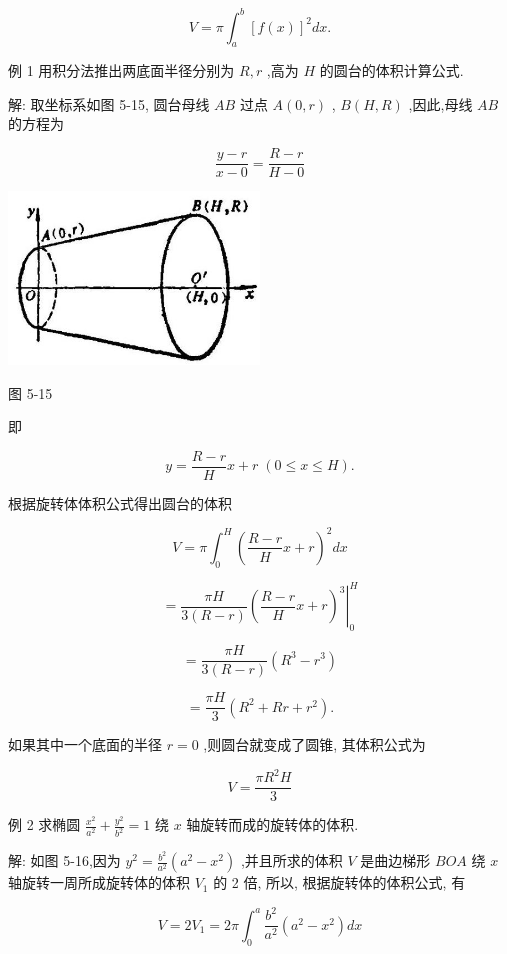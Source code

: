 \documentclass[lang=cn,newtx,12pt,scheme=chinese]{elegantbook}
\begin{document}
\[
V = \pi {\int }_{a}^{b}{\left\lbrack f\left( x\right) \right\rbrack }^{2}{dx}.
\]

例 1 用积分法推出两底面半径分别为 \(R,r\) ,高为 \(H\) 的圆台的体积计算公式.

解: 取坐标系如图 5-15, 圆台母线 \({AB}\) 过点 \(A\left( {0,r}\right)\) , \(B\left( {H,R}\right)\) ,因此,母线 \({AB}\) 的方程为

\[
\frac{y - r}{x - 0} = \frac{R - r}{H - 0}
\]

\begin{center}
\includegraphics[max width=0.5\textwidth]{images/01912c18-5c3f-733d-b775-749ba9897a9d_237_214548.jpg}
\end{center}

图 5-15

即

\[
y = \frac{R - r}{H}x + r\;\left( {0 \leq x \leq H}\right) .
\]

根据旋转体体积公式得出圆台的体积

\[
V = \pi {\int }_{0}^{H}{\left( \frac{R - r}{H}x + r\right) }^{2}{dx}
\]

\[
= {\left. \frac{\pi H}{3\left( {R - r}\right) }{\left( \frac{R - r}{H}x + r\right) }^{3}\right| }_{0}^{H}
\]

\[
= \frac{\pi H}{3\left( {R - r}\right) }\left( {{R}^{3} - {r}^{3}}\right)
\]

\[
= \frac{\pi H}{3}\left( {{R}^{2} + {Rr} + {r}^{2}}\right) \text{.}
\]

如果其中一个底面的半径 \(r = 0\) ,则圆台就变成了圆锥, 其体积公式为

\[
V = \frac{\pi {R}^{2}H}{3}
\]

例 2 求椭圆 \(\frac{{x}^{2}}{{a}^{2}} + \frac{{y}^{2}}{{b}^{2}} = 1\) 绕 \(x\) 轴旋转而成的旋转体的体积.

解: 如图 5-16,因为 \({y}^{2} = \frac{{b}^{2}}{{a}^{2}}\left( {{a}^{2} - {x}^{2}}\right)\) ,并且所求的体积 \(V\) 是曲边梯形 \({BOA}\) 绕 \(x\) 轴旋转一周所成旋转体的体积 \({V}_{1}\) 的 2 倍, 所以, 根据旋转体的体积公式, 有

\[
V = 2{V}_{1} = {2\pi }{\int }_{0}^{a}\frac{{b}^{2}}{{a}^{2}}\left( {{a}^{2} - {x}^{2}}\right) {dx}
\]
\end{document}
